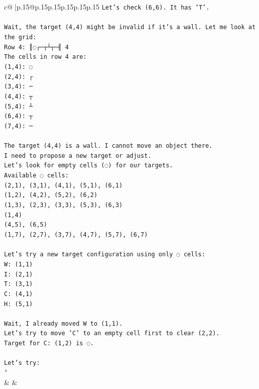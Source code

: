 \documentclass{article}
\begin{document}
{\begin{supertabular}{c@{$\;$}|p{.15\linewidth}@{}p{.15\linewidth}p{.15\linewidth}p{.15\linewidth}p{.15\linewidth}p{.15\linewidth}}
{{{\texttt{Let's check (6,6). It has 'T'.} \\
\\ 
\texttt{Wait, the target (4,4) might be invalid if it's a wall. Let me look at the grid:} \\
\texttt{Row 4: ║◌┌─┬┴┬─╢ 4} \\
\texttt{The cells in row 4 are:} \\
\texttt{(1,4): ◌} \\
\texttt{(2,4): ┌} \\
\texttt{(3,4): ─} \\
\texttt{(4,4): ┬} \\
\texttt{(5,4): ┴} \\
\texttt{(6,4): ┬} \\
\texttt{(7,4): ─} \\
\\ 
\texttt{The target (4,4) is a wall. I cannot move an object there.} \\
\texttt{I need to propose a new target or adjust.} \\
\texttt{Let's look for empty cells (◌) for our targets.} \\
\texttt{Available ◌ cells:} \\
\texttt{(2,1), (3,1), (4,1), (5,1), (6,1)} \\
\texttt{(1,2), (4,2), (5,2), (6,2)} \\
\texttt{(1,3), (2,3), (3,3), (5,3), (6,3)} \\
\texttt{(1,4)} \\
\texttt{(4,5), (6,5)} \\
\texttt{(1,7), (2,7), (3,7), (4,7), (5,7), (6,7)} \\
\\ 
\texttt{Let's try a new target configuration using only ◌ cells:} \\
\texttt{W: (1,1)} \\
\texttt{I: (2,1)} \\
\texttt{T: (3,1)} \\
\texttt{C: (4,1)} \\
\texttt{H: (5,1)} \\
\\ 
\texttt{Wait, I already moved W to (1,1).} \\
\texttt{Let's try to move 'C' to an empty cell first to clear (2,2).} \\
\texttt{Target for C: (1,2) is ◌.} \\
\\ 
\texttt{Let's try:} \\
\texttt{'} \\
            }
        }
    }
    & & \\ \\


\end{supertabular}}
\end{document}
